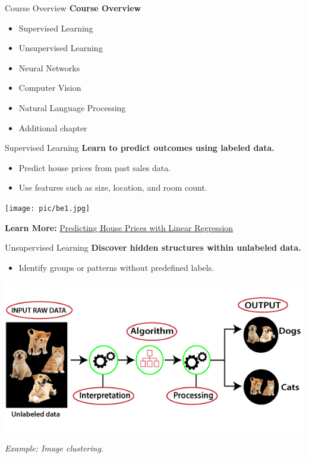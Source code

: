 \documentclass[serif, aspectratio=169]{beamer}
\begin{document}
\begin{frame}{Course Overview}
\textbf{Course Overview}
\begin{itemize}
    \item Supervised Learning
    \item Unsupervised Learning
    \item Neural Networks
    \item Computer Vision
    \item Natural Language Processing
    \item Additional chapter
\end{itemize}
\end{frame}






\begin{frame}{Supervised Learning}
\textbf{Learn to predict outcomes using labeled data.}

\begin{itemize}
    \item Predict house prices from past sales data.
    \item Use features such as size, location, and room count.
\end{itemize}


\begin{center}
    \centering
    \texttt{[image: pic/be1.jpg]}
\end{center}

\textbf{Learn More:}
\href{https://towardsdatascience.com/predicting-house-prices-with-linear-regression-machine-learning-from-scratch-part-ii-47a0238aeac1}{Predicting House Prices with Linear Regression}
\end{frame}

\begin{frame}{Unsupervised Learning}
\textbf{Discover hidden structures within unlabeled data.}

\begin{itemize}
    \item Identify groups or patterns without predefined labels.
\end{itemize}

\begin{center}
    \includegraphics[width=0.7\linewidth]{pic/be2.png}
\end{center}

\begin{center}
\textit{Example: Image clustering.}
\end{center}
\end{frame}
\end{document}
